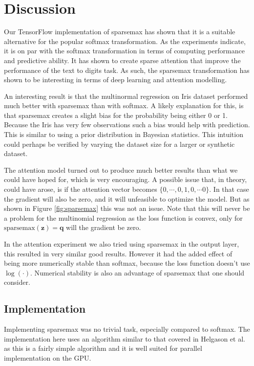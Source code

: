 \section{Discussion}
Our TensorFlow implementation of sparsemax has shown that it is a suitable alternative for the popular softmax transformation. As the experiments indicate, it is on par with the softmax transformation in terms of computing performance and predictive ability.
It has shown to create sparse attention that improve the performance of the text to digits task. As such, the sparsemax transformation has shown to be interesting in terms of deep learning and attention modelling.

An interesting result is that the multinormal regression on Iris dataset performed much better with sparsemax than with softmax. A likely explanation for this, is that sparsemax creates a slight bias for the probability being either 0 or 1. Because the Iris has very few observations such a bias would help with prediction. This is similar to using a prior distribution in Bayesian statistics. This intuition could perhaps be verified by varying the dataset size for a larger or synthetic dataset.

The attention model turned out to produce much better results than what we could have hoped for, which is very encouraging. A possible issue that, in theory, could have arose, is if the attention vector becomes $\{0, \cdots, 0, 1, 0, \cdots 0\}$. In that case the gradient will also be zero, and it will unfeasible to optimize the model. But as shown in Figure \ref{fig:sparsemax} this was not an issue. Note that this will never be a problem for the multinomial regression as the loss function is convex, only for $\mathrm{sparsemax}(\mathbf{z}) = \mathbf{q}$ will the gradient be zero.

In the attention experiment we also tried using sparsemax in the output layer, this resulted in very similar good results. However it had the added effect of being more numerically stable than softmax, because the loss function doesn't use $\log(\cdot)$. Numerical stability is also an advantage of sparsemax that one should consider.

\subsection{Implementation}
Implementing sparsemax was no trivial task, especially compared to softmax. The implementation here uses an algorithm similar to that covered in Helgason et al. \cite{Helgason1980} as this is a fairly simple algorithm and it is well suited for parallel implementation on the GPU.

